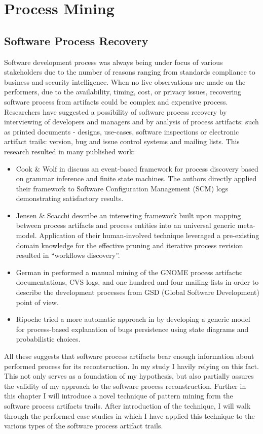 \chapter{Process Mining}

\section{Software Process Recovery}
Software development process was always being under focus of various stakeholders due to the number of reasons ranging from standards compliance to business and security intelligence. When no live observations are made on the performers, due to the availability, timing, cost, or privacy issues, recovering software process from artifacts could be complex and expensive process. Researchers have suggested a possibility of software process recovery by interviewing of developers and managers and by analysis of process artifacts: such as printed documents - designs, use-cases, software inspections or electronic artifact trails: version, bug and issue control systems and mailing lists. This research resulted in many published work:
\begin{itemize}
\item{Cook \& Wolf in \cite{citeulike:328044} discuss an event-based framework for process discovery based on grammar inference and finite state machines. The authors directly applied their framework to Software Configuration Management (SCM) logs demonstrating satisfactory results.}
\item{Jensen \& Scacchi \cite{citeulike:5043664} describe an interesting framework built upon mapping between process artifacts and process entities into an universal generic meta-model. Application of their human-involved technique leveraged a pre-existing domain knowledge for the effective pruning and iterative process revision resulted in ``workflows discovery''.}
\item{German in \cite{citeulike:421438} performed a manual mining of the GNOME process artifacts: documentations, CVS logs, and one hundred and four mailing-lists in order to
describe the development processes from GSD (Global Software Development) point of view.}
\item{Ripoche tried a more automatic approach in \cite{citeulike:9112798} by developing a generic model for process-based explanation of bugs persistence using state diagrams and
probabilistic choices.}
\end{itemize}
All these suggests that software process artifacts bear enough information about performed process for its recontsruction. In my study I havily relying on this fact. This not only serves as a foundation of my hypothesis, but also partially assures the validity of my approach to the software process reconstruction. Further in this chapter I will introduce a novel technique of pattern mining form the software process artifacts trails. After introduction of the technique, I will walk through the performed case studies in which I have applied this technique to the various types of the software process artifact trails.




